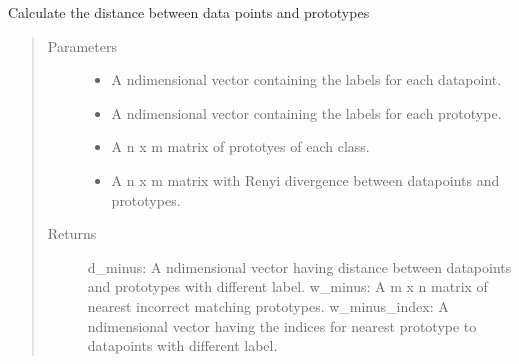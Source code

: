 \documentclass[letterpaper,10pt,english]{sphinxmanual}
\begin{document}
\begin{fulllineitems}
\begin{fulllineitems}
\end{fulllineitems}


\begin{fulllineitems}
\label{\detokenize{Renyi_final:Renyi_final.GLVQ.calculate_d_minus}}
\sphinxAtStartPar
Calculate the distance between data points and prototypes
\begin{quote}\begin{description}
\item[{Parameters}] \leavevmode\begin{itemize}
\item {} 
\sphinxAtStartPar
{} \textendash{} A n\sphinxhyphen{}dimensional vector containing the labels for each datapoint.

\item {} 
\sphinxAtStartPar
{} \textendash{} A n\sphinxhyphen{}dimensional vector containing the labels for each prototype.

\item {} 
\sphinxAtStartPar
{} \textendash{} A n x m matrix of prototyes of each class.

\item {} 
\sphinxAtStartPar
{} \textendash{} A n x m matrix with Renyi divergence between datapoints and prototypes.

\end{itemize}

\item[{Returns}] \leavevmode
\sphinxAtStartPar
d\_minus: A n\sphinxhyphen{}dimensional vector having distance between datapoints and prototypes with different label.
w\_minus: A m x n matrix of nearest incorrect matching prototypes.
w\_minus\_index: A n\sphinxhyphen{}dimensional vector having the indices for nearest prototype to datapoints with different label.

\end{description}\end{quote}


\end{fulllineitems}
\end{fulllineitems}
\end{document}
